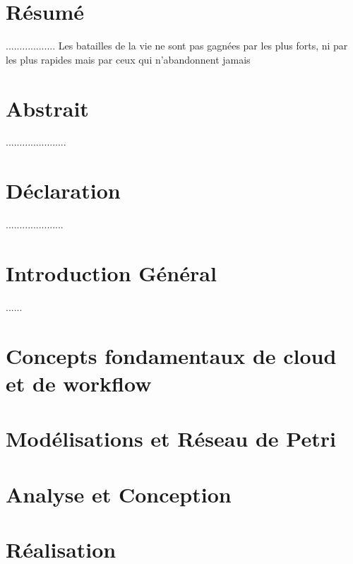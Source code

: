 \documentclass[12pt,twoside]{report}
\author{Zerrouki Djamel}
\theoremstyle{plain}
\theoremstyle{definition}
\theoremstyle{Remarque}
\begin{document}
 
 
\chapter*{Résumé} 
..................
Les batailles de la vie ne sont pas gagnées par les plus forts, ni par les plus rapides mais par ceux qui n'abandonnent jamais
\chapter*{Abstrait}
......................

\chapter*{Déclaration}
.....................
\chapter*{Introduction Général }
 ......


\tableofcontents

\listoffigures

\listoftables
 
\chapter{Concepts fondamentaux de cloud et de workflow }



\chapter{Modélisations et Réseau de Petri}


\chapter{Analyse et Conception}

 
 
 \chapter{Réalisation}
 
 

 \printbibliography
 
\end{document}
